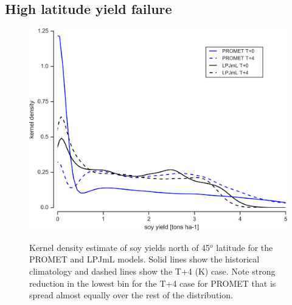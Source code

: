 \documentclass[10pt]{article}
\begin{document}
\subsection{High latitude yield failure}
\begin{figure}[h!]
\includegraphics[width=\textwidth]{testhighlatskde.png}\\
\caption{Kernel density estimate of soy yields north of 45$^o$ latitude for the PROMET and LPJmL models. Solid lines show the historical climatology and dashed lines show the T+4 (K) case. Note strong reduction in the lowest bin for the T+4 case for PROMET that is spread almost equally over the rest of the distribution.}
\label{fig:highlat}
\end{figure}

\clearpage
\end{document}
